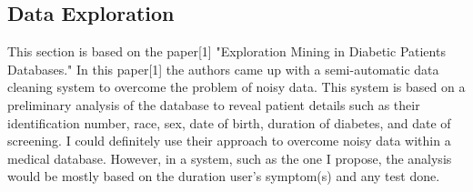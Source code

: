 \documentclass[sts]{sig-alternate}
\begin{document}
	\subsection{Data Exploration}
		\label{Data Exploration}
	
		This section is based on the paper[1] "Exploration Mining in Diabetic Patients Databases." In 			this paper[1] the authors came up with a semi-automatic data cleaning system to overcome the 				problem of noisy data. This system is based on a preliminary analysis of the database to reveal 			patient details such as their identification number, race, sex, date of birth, duration of 				diabetes, and date of screening. I could definitely use their approach to overcome noisy data 			within a medical database. However, in a system, such as the one I propose, the analysis would 			be mostly based on the duration user's symptom(s) and any test done.
	
\end{document}

